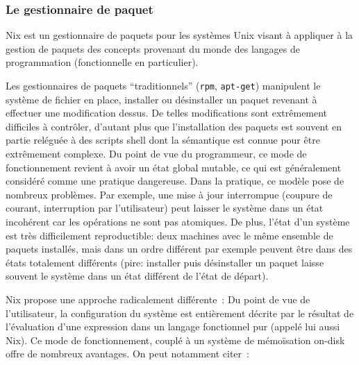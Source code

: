 \subsubsection{Le gestionnaire de paquet}
Nix est un gestionnaire de paquets pour les systèmes Unix visant à appliquer à
la gestion de paquets des concepts provenant du monde des langages de
programmation (fonctionnelle en particulier).

Les gestionnaires de paquets ``traditionnels'' (\verb|rpm|, \verb|apt-get|)
manipulent le système de fichier en place, installer ou désinstaller un paquet
revenant à effectuer une modification dessus. De telles modifications sont
extrêmement difficiles à contrôler, d'autant plus que l'installation des
paquets est souvent en partie reléguée à des scripts shell dont la sémantique
est connue pour être extrêmement complexe.
Du point de vue du programmeur, ce mode de fonctionnement revient à avoir un
état global mutable, ce qui est généralement considéré comme une pratique
dangereuse.
Dans la pratique, ce modèle pose de nombreux problèmes. Par exemple, une mise à
jour interrompue (coupure de courant, interruption par l'utilisateur) peut
laisser le système dans un état incohérent car les opérations ne sont pas
atomiques.
De plus, l'état d'un système est très difficilement reproductible: deux
machines avec le même ensemble de paquets installés, mais dans un ordre
différent par exemple peuvent être dans des états totalement différents (pire:
installer puis désinstaller un paquet laisse souvent le système dans un état
différent de l'état de départ).

Nix propose une approche radicalement différente : Du point de vue de
l'utilisateur, la configuration du système est entièrement décrite par le
résultat de l'évaluation d'une expression dans un langage fonctionnel pur
(appelé lui aussi Nix). Ce mode de fonctionnement, couplé à un système de
mémoïsation on-disk offre de nombreux avantages. On peut notamment citer :

